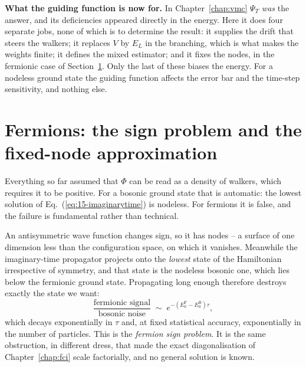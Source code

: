 \begin{notebox}
\textbf{What the guiding function is now for.}  In Chapter~\ref{chap:vmc}
$\Psi_T$ \emph{was} the answer, and its deficiencies appeared directly in the
energy.  Here it does four separate jobs, none of which is to determine the
result: it supplies the drift that steers the walkers; it replaces $V$ by
$E_L$ in the branching, which is what makes the weights finite; it defines the
mixed estimator; and it fixes the nodes, in the fermionic case of
Section~\ref{sec:dmcfixednode}.  Only the last of these biases the energy.
For a nodeless ground state the guiding function affects the error bar and the
time-step sensitivity, and nothing else.
\end{notebox}

\section{Fermions: the sign problem and the fixed-node approximation}
\label{sec:dmcfixednode}

Everything so far assumed that $\Phi$ can be read as a density of walkers,
which requires it to be positive.  For a bosonic ground state that is
automatic: the lowest solution of Eq.~(\ref{eq:15-imaginarytime}) is nodeless.
For fermions it is false, and the failure is fundamental rather than
technical.

An antisymmetric wave function changes sign, so it has nodes -- a surface of
one dimension less than the configuration space, on which it vanishes.
Meanwhile the imaginary-time propagator projects onto the \emph{lowest} state
of the Hamiltonian irrespective of symmetry, and that state is the nodeless
bosonic one, which lies below the fermionic ground state.  Propagating long
enough therefore destroys exactly the state we want:
\begin{equation}
  \frac{\text{fermionic signal}}{\text{bosonic noise}}
   \;\sim\; e^{-\left(E_0^{\mathrm{F}}-E_0^{\mathrm{B}}\right)\tau},
  \label{eq:15-signproblem}
\end{equation}
which decays exponentially in $\tau$ and, at fixed statistical accuracy,
exponentially in the number of particles.  This is the \emph{fermion sign
problem}.  It is the same obstruction, in different dress, that made the exact
diagonalisation of Chapter~\ref{chap:fci} scale factorially, and no general
solution is known.


